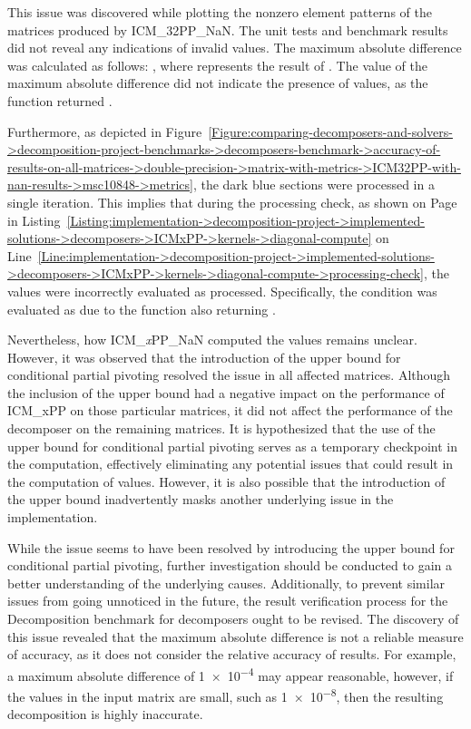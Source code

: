This issue was discovered while plotting the nonzero element patterns of the  matrices produced by ICM\_32PP\_NaN.
The unit tests and benchmark results did not reveal any indications of invalid values.
The maximum absolute difference was calculated as follows: , where  represents the result of .
The value of the maximum absolute difference did not indicate the presence of  values, as the  function returned .

Furthermore, as depicted in Figure~\ref{Figure:comparing-decomposers-and-solvers->decomposition-project-benchmarks->decomposers-benchmark->accuracy-of-results-on-all-matrices->double-precision->matrix-with-metrics->ICM32PP-with-nan-results->msc10848->metrics}, the dark blue sections were processed in a single iteration.
This implies that during the processing check, as shown on
Page~\pageref{Listing:implementation->decomposition-project->implemented-solutions->decomposers->ICMxPP->kernels->diagonal-compute} in Listing~\ref{Listing:implementation->decomposition-project->implemented-solutions->decomposers->ICMxPP->kernels->diagonal-compute} on Line~\ref{Line:implementation->decomposition-project->implemented-solutions->decomposers->ICMxPP->kernels->diagonal-compute->processing-check}, the  values were incorrectly evaluated as processed.
Specifically, the condition  was evaluated as  due to the  function also returning .

Nevertheless, how ICM\_\textit{x}PP\_NaN computed the  values remains unclear.
However, it was observed that the introduction of the upper bound for conditional partial pivoting resolved the issue in all affected matrices.
Although the inclusion of the upper bound had a negative impact on the performance of ICM\_xPP on those particular matrices, it did not affect the performance of the decomposer on the remaining matrices.
It is hypothesized that the use of the upper bound for conditional partial pivoting serves as a temporary checkpoint in the computation, effectively eliminating any potential issues that could result in the computation of  values.
However, it is also possible that the introduction of the upper bound inadvertently masks another underlying issue in the implementation.

While the issue seems to have been resolved by introducing the upper bound for conditional partial pivoting, further investigation should be conducted to gain a better understanding of the underlying causes.
Additionally, to prevent similar issues from going unnoticed in the future, the result verification process for the Decomposition benchmark for decomposers ought to be revised.
The discovery of this issue revealed that the maximum absolute difference is not a reliable measure of accuracy, as it does not consider the relative accuracy of results.
For example, a maximum absolute difference of \num{1e-4} may appear reasonable, however, if the values in the input matrix are small, such as \num{1e-8}, then the resulting decomposition is highly inaccurate.

